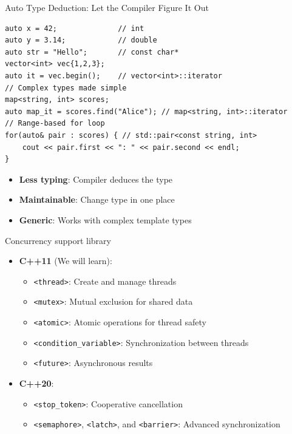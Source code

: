 \begin{frame}[fragile]{Auto Type Deduction: Let the Compiler Figure It Out}
			\begin{verbatim}
auto x = 42;              // int
auto y = 3.14;            // double
auto str = "Hello";       // const char*
vector<int> vec{1,2,3};
auto it = vec.begin();    // vector<int>::iterator
// Complex types made simple
map<string, int> scores;
auto map_it = scores.find("Alice"); // map<string, int>::iterator
// Range-based for loop
for(auto& pair : scores) { // std::pair<const string, int>
    cout << pair.first << ": " << pair.second << endl;
}
			\end{verbatim}
	\begin{itemize}
		\item \textbf{Less typing}: Compiler deduces the type
		\item \textbf{Maintainable}: Change type in one place
		\item \textbf{Generic}: Works with complex template types
	\end{itemize}
\end{frame}

\begin{frame}[fragile]{Concurrency support library}
    \begin{itemize}
        \item \textbf{C++11} (We will learn):
              \begin{itemize}
                  \item \texttt{<thread>}: Create and manage threads
                  \item \texttt{<mutex>}: Mutual exclusion for shared data
                  \item \texttt{<atomic>}: Atomic operations for thread safety
                  \item \texttt{<condition\_variable>}: Synchronization between threads
                  \item \texttt{<future>}: Asynchronous results
              \end{itemize}
        \item \textbf{C++20}:
              \begin{itemize}
                  \item \texttt{<stop\_token>}: Cooperative cancellation
                  \item \texttt{<semaphore>}, \texttt{<latch>}, and \texttt{<barrier>}: Advanced synchronization
              \end{itemize}
    \end{itemize}
\end{frame}
